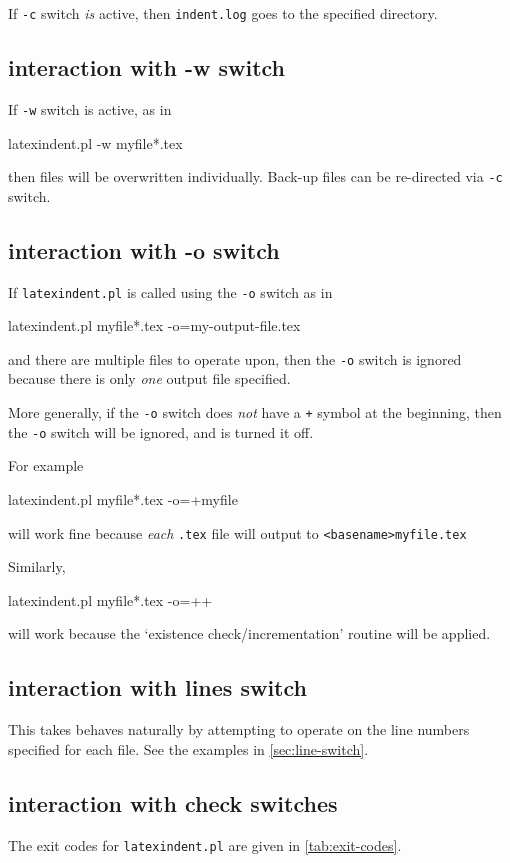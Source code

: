 		If \texttt{-c} switch \emph{is} active, then \texttt{indent.log} goes to the specified
		directory.

	\subsection{interaction with -w switch}
		If \texttt{-w} switch is active, as in
		\begin{commandshell}
latexindent.pl -w myfile*.tex
        \end{commandshell}
		then files will be overwritten individually. Back-up files can be re-directed via
		\texttt{-c} switch.

	\subsection{interaction with -o switch}
		If \texttt{latexindent.pl} is called using the \texttt{-o} switch as in
		\begin{commandshell}
latexindent.pl myfile*.tex -o=my-output-file.tex 
        \end{commandshell}
		and there are multiple files to operate upon, then the \texttt{-o} switch is ignored
		because there is only \emph{one} output file specified.

		More generally, if the \texttt{-o} switch does \emph{not} have a \texttt{+} symbol at the
		beginning, then the \texttt{-o} switch will be ignored, and is turned it off.

		For example
		\begin{commandshell}
latexindent.pl myfile*.tex -o=+myfile
\end{commandshell}
		will work fine because \emph{each} \texttt{.tex} file will output to
		\texttt{<basename>myfile.tex}

		Similarly,
		\begin{commandshell}
latexindent.pl myfile*.tex -o=++
\end{commandshell}
		will work because the `existence check/incrementation' routine will be applied.

	\subsection{interaction with lines switch}
		This takes behaves naturally by attempting to operate on the line numbers specified for each file. See
		the examples in \cref{sec:line-switch}.

	\subsection{interaction with check switches}
		The exit codes for \texttt{latexindent.pl} are given in \vref{tab:exit-codes}.

